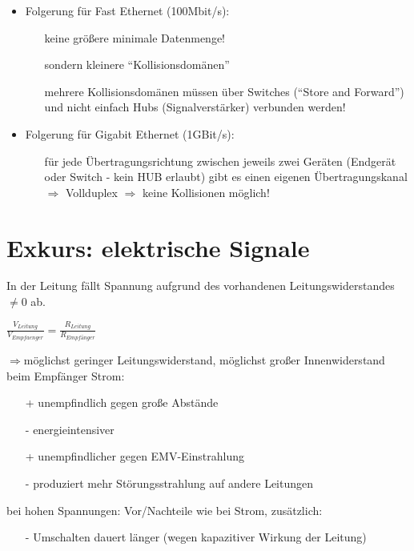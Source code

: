 \begin{description}
\begin{itemize}
\item Folgerung für Fast Ethernet (100Mbit/s):
\begin{itemize}
\item[]keine größere minimale Datenmenge!
\item[]sondern kleinere “Kollisionsdomänen”
\item[]mehrere Kollisionsdomänen müssen über Switches (“Store and Forward”) und nicht einfach Hubs (Signalverstärker) verbunden werden!
\end{itemize}

\item Folgerung für Gigabit Ethernet (1GBit/s):
\begin{itemize}
\item[]für jede Übertragungsrichtung zwischen jeweils zwei Geräten (Endgerät oder Switch -  kein HUB erlaubt) gibt es einen eigenen Übertragungskanal $\Rightarrow$ Vollduplex $\Rightarrow$ keine Kollisionen möglich!
\end{itemize}
\end{itemize}
\end{description}

\section{Exkurs: elektrische Signale}
In der Leitung fällt Spannung aufgrund des vorhandenen Leitungswiderstandes $\neq 0$ ab.
\par
\begin{center}
$\frac{V_{Leitung}}{V_{Empfaenger}} = \frac{R_{Leitung}}{R_{Empfänger}}$\\
\end{center}$\Rightarrow$möglichst geringer Leitungswiderstand, möglichst großer Innenwiderstand beim Empfänger
Strom: 
\begin{itemize}
\item[+]unempfindlich gegen große Abstände
\item[-]energieintensiver
\item[+]unempfindlicher gegen EMV-Einstrahlung
\item[-]produziert mehr Störungsstrahlung auf andere Leitungen
\end{itemize}
bei hohen Spannungen: Vor/Nachteile wie bei Strom, zusätzlich:
\begin{itemize}
\item[-]Umschalten dauert länger (wegen kapazitiver Wirkung der Leitung)
\end{itemize}

